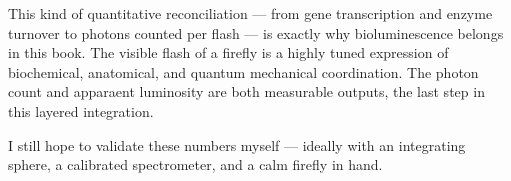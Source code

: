 \begin{commentary}
This kind of quantitative reconciliation — from gene transcription and enzyme turnover to photons counted per flash — is exactly why bioluminescence belongs in this book. The visible flash of a firefly is a highly tuned expression of biochemical, anatomical, and quantum mechanical coordination. The photon count and apparaent luminosity are both measurable outputs, the last step in this layered integration.

I still hope to validate these numbers myself — ideally with an integrating sphere, a calibrated spectrometer, and a calm firefly in hand.
\end{commentary}
